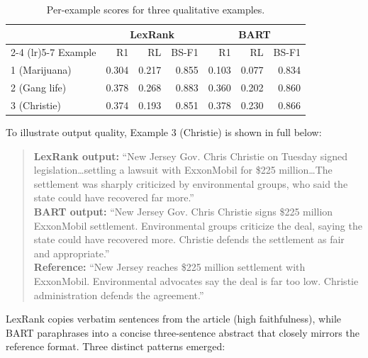 \documentclass[11pt,a4paper]{article}
\begin{document}
\begin{table}[H]
\centering
\caption{Per-example scores for three qualitative examples.}
\label{tab:q3qual}
\begin{tabular}{lrrrrrr}
\toprule
 & \multicolumn{3}{c}{LexRank} & \multicolumn{3}{c}{BART} \\
\cmidrule(lr){2-4} \cmidrule(lr){5-7}
Example & R1 & RL & BS-F1 & R1 & RL & BS-F1 \\
\midrule
1 (Marijuana) & 0.304 & 0.217 & 0.855 & 0.103 & 0.077 & 0.834 \\
2 (Gang life)  & 0.378 & 0.268 & 0.883 & 0.360 & 0.202 & 0.860 \\
3 (Christie)   & 0.374 & 0.193 & 0.851 & 0.378 & 0.230 & 0.866 \\
\bottomrule
\end{tabular}
\end{table}

To illustrate output quality, Example 3 (Christie) is shown in full below:

\begin{quote}
\textbf{LexRank output:} ``New Jersey Gov. Chris Christie on Tuesday signed legislation\ldots settling a lawsuit with ExxonMobil for \$225 million\ldots The settlement was sharply criticized by environmental groups, who said the state could have recovered far more.''\\[4pt]
\textbf{BART output:} ``New Jersey Gov. Chris Christie signs \$225 million ExxonMobil settlement. Environmental groups criticize the deal, saying the state could have recovered more. Christie defends the settlement as fair and appropriate.''\\[4pt]
\textbf{Reference:} ``New Jersey reaches \$225 million settlement with ExxonMobil. Environmental advocates say the deal is far too low. Christie administration defends the agreement.''
\end{quote}

LexRank copies verbatim sentences from the article (high faithfulness), while BART paraphrases into a concise three-sentence abstract that closely mirrors the reference format. Three distinct patterns emerged:
\end{document}
